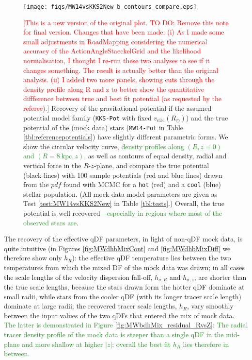 \documentclass[iop,revtex4]{emulateapj}
\newcommand{\pdf}{\ensuremath{pdf}}
\newcommand{\NEW}[1]{\textcolor{ForestGreen}{#1}}
\newcommand{\NOTE}[1]{\textcolor{Red}{#1}}
\newcommand{\OLD}[1]{}
\begin{document}
\begin{figure}[!htbp]
\centering
\texttt{[image: figs/MW14vsKKS2New\_b\_contours\_compare.eps]}
\caption{\NOTE{[This is a new version of the original plot. TO DO: Remove this note for final version. Changes that have been made: (i) As I made some small adjustments in RoadMapping considering the numerical accuracy of the ActionAngleStaeckelGrid and the likelihood normalisation, I thought I re-run these two analyses to see if it changes something. The result is actually better than the original analysis. (ii) I added two more panels, showing cuts through the density profile along R and z to better show the quantitative diffference between true and best fit potential (as requested by the referee).]} Recovery of the gravitational potential if the assumed potential model family (\texttt{KKS-Pot} with fixed $v_\text{circ}(R_\odot)$) and the true potential of the (mock data) stars (\texttt{MW14-Pot} in Table \ref{tbl:referencepotentials}) have slightly different parametric forms. We show the circular velocity curve, \NEW{density profiles along $(R,z=0)$ and $(R=8~\text{kpc},z)$,} as well as contours of equal density, radial and vertical force in the $R$-$z$-plane, and compare the true potential (black lines) with 100 sample potentials (red and blue lines) drawn from the \pdf{} found with MCMC for a \texttt{hot} (red) and a \texttt{cool} (blue) stellar population. (All mock data model parameters are given as Test \ref{test:MW14vsKKS2New} in Table \ref{tbl:tests}.) Overall, the true potential is well recovered\NEW{---especially in regions where most of the observed stars are}.}
\label{fig:MW14vsKKS2New_contours}
\end{figure}

The recovery of the effective qDF parameters, in light of non-qDF mock data, is quite intuitive (in Figures \ref{fig:MWdhbMixCont} and \ref{fig:MWdhbMixDiff} we therefore show only $h_R$): the effective qDF temperature lies between the two temperatures from which the mixed DF of the mock data was drawn; in all cases the scale lengths of the velocity dispersion fall-off, $h_{\sigma,R}$ and $h_{\sigma,z}$, are shorter than the true scale lengths, because the stars drawn form the hotter qDF dominate at small radii, while stars from the cooler qDF (with its longer tracer scale length) dominate at large radii; the recovered tracer scale lengths, $h_R$, vary smoothly between the input values of the two qDFs that entered the mix of mock data\OLD{, with again the impact of contamination by a hotter qDF (with its shorter scale length in this case) being more important}. \NEW{The latter is demonstrated in Figure \ref{fig:MWbdhMix_residual_RvsZ}: The radial tracer density profile of the mock data is steeper than a single qDF in the mid-plane and more shallow at higher $|z|$; overall the best fit $h_R$ lies therefore in between.}
\end{document}
